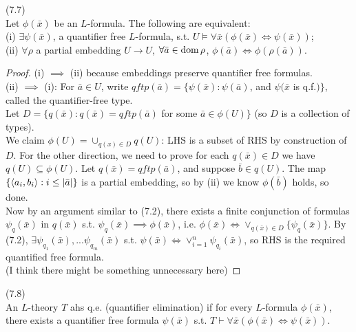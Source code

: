 \documentclass[a4paper]{article}
\begin{document}
\begin{prop} (7.7)\\
    Let $\phi(\bar{x})$ be an $L$-formula. The following are equivalent:\\
    (i) $\exists \psi(\bar{x})$, a quantifier free $L$-formula, s.t. $U \vDash \forall \bar{x}(\phi(\bar{x}) \iff \psi(\bar{x}))$;\\
    (ii) $\forall \rho$ a partial embedding $U \to U$, $\forall \bar{a} \in \operatorname{dom} \rho$, $\phi(\bar{a}) \iff \phi(\rho(\bar{a}))$.
    \begin{proof}
        (i) $\implies$ (ii) because embeddings preserve quantifier free formulas.\\
        (ii) $\implies$ (i): For $\bar{a} \in U$, write $qftp(\bar{a}) = \{\psi(\bar{x}):\psi(\bar{a})$, and $\psi(\bar{x}$ is q.f.$)\}$, called the quantifier-free type.\\
        Let $D = \{q(\bar{x}): q(\bar{x}) = qftp(\bar{a})$ for some $\bar{a} \in \phi(U)\}$ (so $D$ is a collection of types).\\
        We claim $\phi(U) = \cup_{q(x) \in D} q(U)$: LHS is a subset of RHS by construction of $D$. For the other direction, we need to prove for each $q(\bar{x}) \in D$ we have $q(U) \subseteq \phi(U)$. Let $q(\bar{x}) = qftp(\bar{a})$, and suppose $\bar{b} \in q(U)$. The map $\{\langle a_i,b_i \rangle: i \leq |\bar{a}|\}$ is a partial embedding, so by (ii) we know $\phi(\bar{b})$ holds, so done.\\
        Now by an argument similar to (7.2), there exists a finite conjunction of formulas $\psi_q(\bar{x})$ in $q(\bar{x})$ s.t. $\psi_q(\bar{x}) \implies \phi(\bar{x})$, i.e. $\phi(\bar{x}) \iff \vee_{q(\bar{x}) \in D} \{\psi_q(\bar{x})\}$. By (7.2), $\exists \psi_{q_1}(\bar{x}),... \psi_{q_m}(\bar{x})$ s.t. $\psi(\bar{x}) \iff \vee_{i=1}^n \psi_{q_i}(\bar{x})$, so RHS is the required quantified free formula.\\
        (I think there might be something unnecessary here)
    \end{proof}
\end{prop}

\begin{defi} (7.8)\\
    An $L$-theory $T$ ahs q.e. (quantifier elimination) if for every $L$-formula $\phi(\bar{x})$, there exists a quantifier free formula $\psi(\bar{x})$ s.t. $T \vdash \forall \bar{x} (\phi(\bar{x}) \iff \psi(\bar{x}))$.
\end{defi}
\end{document}
